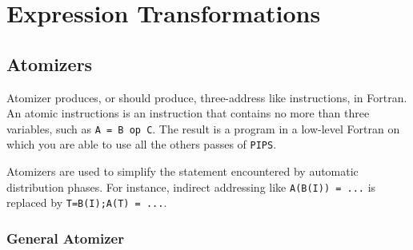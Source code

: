 \documentclass[a4paper]{report}
\newenvironment{PipsMake}{\begin{alltt}}{\end{alltt}}
\newenvironment{PipsPass}[1]{\label{pass:#1}}{}
\newcommand{\Pips}{\texttt{PIPS}}
\begin{document}








\section{Expression Transformations}


\subsection{Atomizers}
\label{subsection-atomizers}

\begin{PipsPass}{atomizer}
Atomizer produces, or should produce, three-address like instructions,
in Fortran. An atomic instructions is an instruction that contains no
more than three variables, such as {\tt A = B op C}. The result is a
program in a low-level Fortran on which you are able to use all the
others passes of \Pips{}.

Atomizers are used to simplify the statement encountered by automatic
distribution phases. For instance, indirect addressing like
\verb/A(B(I)) = .../ is replaced by \verb/T=B(I);A(T) = .../.
\end{PipsPass}

\subsubsection{General Atomizer}
\end{document}
